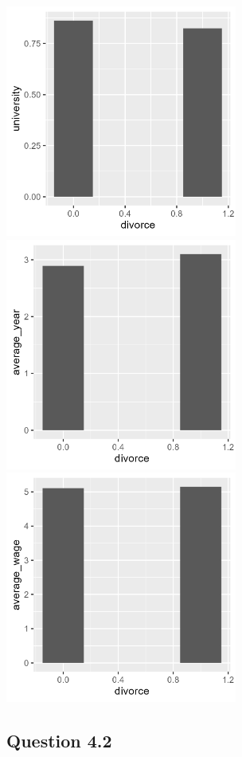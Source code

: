 \documentclass[11pt, letterpaper]{article}
\begin{document}
\includegraphics[height=3in]{univ_graph.png}
\includegraphics[height=3in]{workyear_graph.png}
\includegraphics[height=3in]{wagelevel_graph.png}


\subsection*{Question 4.2}
\end{document}
